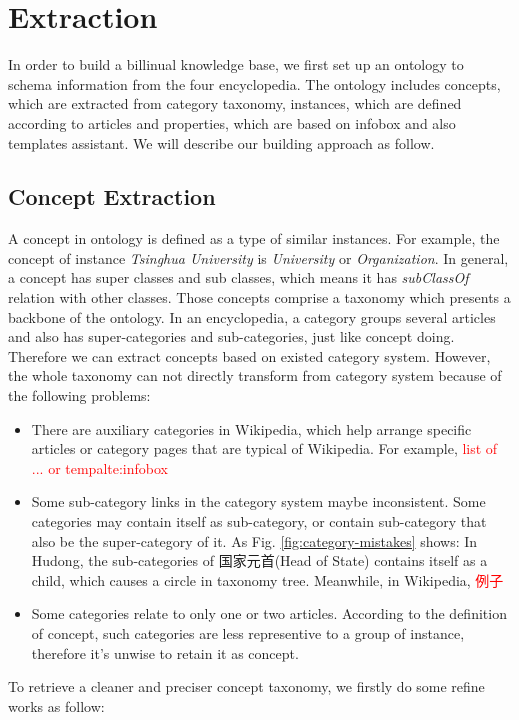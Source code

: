 \documentclass[runningheads,a4paper]{llncs}
\begin{document}
\section{Extraction}
\label{sec:oe}
In order to build a billinual knowledge base, we first set up an ontology to schema information from the four encyclopedia. The ontology includes concepts, which are extracted from category taxonomy, instances, which are defined according to articles and properties, which are based on infobox and also templates assistant. We will describe our building approach as follow.
\subsection{Concept Extraction}
\label{sec:ce}
A concept in ontology is defined as a type of similar instances. For example, the concept of instance \emph{Tsinghua University} is \emph{University} or \emph{Organization}. In general, a concept has super classes and sub classes, which means it has \emph{subClassOf} relation with other classes. Those concepts comprise a taxonomy which presents a backbone of the ontology.
In an encyclopedia, a category groups several articles and also has super-categories and sub-categories, just like concept doing. Therefore we can extract concepts based on existed category system. 
However, the whole taxonomy can not directly transform from category system because of the following problems:
\begin{itemize}
    \item There are auxiliary categories in Wikipedia, which help arrange specific articles or category pages that are typical of Wikipedia. For example, \textcolor{red}{list of ... or tempalte:infobox}
    \item Some sub-category links in the category system maybe inconsistent. Some categories may contain itself as sub-category, or contain sub-category that also be the super-category of it. As Fig. \ref{fig:category-mistakes} shows: In Hudong, the sub-categories of 国家元首(Head of State) contains itself as a child, which causes a circle in taxonomy tree. Meanwhile, in Wikipedia, \textcolor{red}{例子}
    \item Some categories relate to only one or two articles. According to the definition of concept, such categories are less representive to a group of instance, therefore it's unwise to retain it as concept.
\end{itemize}
   To retrieve a cleaner and preciser concept taxonomy, we firstly do some refine works as follow:
\end{document}
